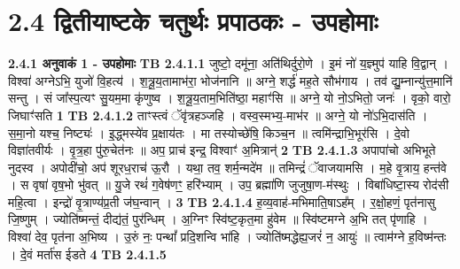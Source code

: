 \documentclass[17pt]{extarticle}
\begin{document}
     \section*{ 2.4     द्वितीयाष्टके चतुर्थः प्रपाठकः - उपहोमाः }
                \textbf{ 2.4.1     अनुवाकं   1 - उपहोमाः} \newline
                                \textbf{ TB 2.4.1.1} \newline
                  जुष्टो॒ दमू॑ना॒ अति॑थिर्दुरो॒णे । इ॒मं नो॑ य॒ज्ञ्मुप॑ याहि वि॒द्वान् । विश्वा॑ अग्नेऽभि॒ युजो॑ वि॒हत्य॑ । श॒त्रू॒य॒तामाभ॑रा॒ भोज॑नानि ॥ अग्ने॒ शर्द्ध॑ मह॒ते सौभ॑गाय । तव॑ द्यु॒म्नान्यु॑त्त॒मानि॑ सन्तु । सं जा᳚स्प॒त्यꣳ सु॒यम॒मा कृ॑णुष्व । श॒त्रू॒य॒ताम॒भिति॑ष्ठा॒ महाꣳ॑सि ॥ अग्ने॒ यो नो॒ऽभितो॒ जनः॑ । वृको॒ वारो॒ जिघाꣳ॑सति \textbf{ 1} \newline
                  \newline
                                \textbf{ TB 2.4.1.2} \newline
                  ताꣳस्त्वं ॅवृ॑त्रहञ्जहि । वस्व॒स्मभ्य॒-माभ॑र ॥ अग्ने॒ यो नो॑ऽभि॒दास॑ति । स॒मा॒नो यश्च॒ निष्ट्यः॑ । इ॒द्ध्मस्ये॑व प्र॒क्षाय॑तः । मा तस्योच्छे॑षि॒ किञ्च॒न ॥ त्वमि॑न्द्राभि॒भूर॑सि । दे॒वो विज्ञा॑तवीर्यः । वृ॒त्र॒हा पु॑रु॒चेत॑नः ॥ अप॒ प्राच॑ इन्द्र॒ विश्वाꣳ॑ अ॒मित्रान्॑ \textbf{ 2} \newline
                  \newline
                                \textbf{ TB 2.4.1.3} \newline
                  अपापा॑चो अभिभूते नुदस्व । अपोदी॑चो॒ अप॑ शूरध॒राच॑ ऊ॒रौ । यथा॒ तव॒ शर्म॒न्मदे॑म ॥ तमिन्द्रं॑ ॅवाजयामसि । म॒हे वृ॒त्राय॒ हन्त॑वे । स वृषा॑ वृष॒भो भु॑वत् ॥ यु॒जे रथं॑ ग॒वेष॑णꣳ॒॒ हरि॑भ्याम् । उप॒ ब्रह्मा॑णि जुजुषा॒ण-म॑स्थुः । विबा॑धिष्टा॒स्य रोद॑सी महि॒त्वा । इन्द्रो॑ वृ॒त्राण्य॑प्र॒ती ज॑घ॒न्वान् । \textbf{ 3} \newline
                  \newline
                                \textbf{ TB 2.4.1.4} \newline
                  ह॒व्य॒वाह॑-मभिमाति॒षाऽह᳚म् । र॒क्षो॒हणं॒ पृत॑नासु जि॒ष्णुम् । ज्योति॑ष्मन्तं॒ दीद्य॑तं॒ पुर॑न्धिम् । अ॒ग्निꣳ स्वि॑ष्ट॒कृत॒मा हु॑वेम ॥ स्वि॑ष्टमग्ने अ॒भि तत् पृ॑णाहि । विश्वा॑ देव॒ पृत॑ना अ॒भिष्य । उ॒रुं नः॒ पन्थां᳚ प्रदि॒शन्वि भा॑हि । ज्योति॑ष्मद्धेह्य॒जरं॑ न॒ आयुः॑ ॥ त्वाम॑ग्ने ह॒विष्म॑न्तः । दे॒वं मर्ता॑स ईडते \textbf{ 4} \newline
                  \newline
                                \textbf{ TB 2.4.1.5} \newline
\end{document}
